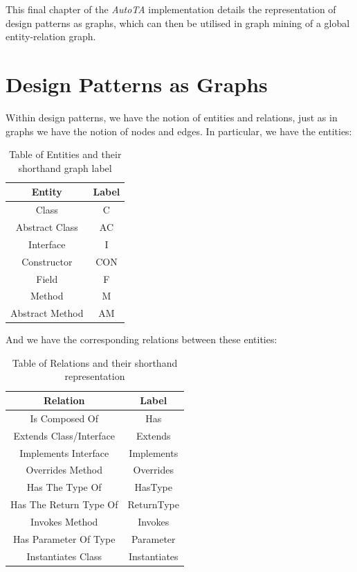 
\label{chapter:part3}
This final chapter of the \emph{AutoTA} implementation details the representation of design patterns as graphs, which can then be utilised in graph mining of a global entity-relation graph.

\section{Design Patterns as Graphs}
Within design patterns, we have the notion of entities and relations, just as in graphs we have the notion of nodes and edges. In particular, we have the entities:

\begin{table}[h]
    \centering
    \begin{tabular}{|c|c|}
        \hline
        \textbf{Entity} & \textbf{Label} \\
        \hline
        Class & C \\
        \hline
        Abstract Class & AC \\
        \hline
        Interface & I \\
        \hline
        Constructor & CON \\
        \hline
        Field & F \\
        \hline
        Method & M \\
        \hline
        Abstract Method & AM \\
        \hline
    \end{tabular}
    \caption{Table of Entities and their shorthand graph label}
    \label{tab:nodes}
\end{table}

And we have the corresponding relations between these entities:

\begin{table}[h]
    \centering
    \begin{tabular}{|c|c|}
        \hline
        \textbf{Relation} & \textbf{Label} \\
        \hline
        Is Composed Of & Has \\
        \hline
        Extends Class/Interface & Extends \\
        \hline
        Implements Interface & Implements \\
        \hline
        Overrides Method & Overrides \\
        \hline
        Has The Type Of & HasType \\
        \hline
        Has The Return Type Of & ReturnType \\
        \hline
        Invokes Method & Invokes \\
        \hline
        Has Parameter Of Type & Parameter \\
        \hline
        Instantiates Class & Instantiates \\
        \hline
    \end{tabular}
    \caption{Table of Relations and their shorthand representation}
    \label{tab:edges}
\end{table}

